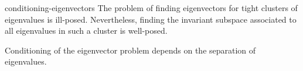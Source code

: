 \begin{Remark}{conditioning-eigenvectors}
  The problem of finding eigenvectors for tight clusters of
  eigenvalues is ill-posed. Nevertheless, finding the invariant
  subspace associated to all eigenvalues in such a cluster is
  well-posed.

  Conditioning of the eigenvector problem depends on the separation of
  eigenvalues.
\end{Remark}

